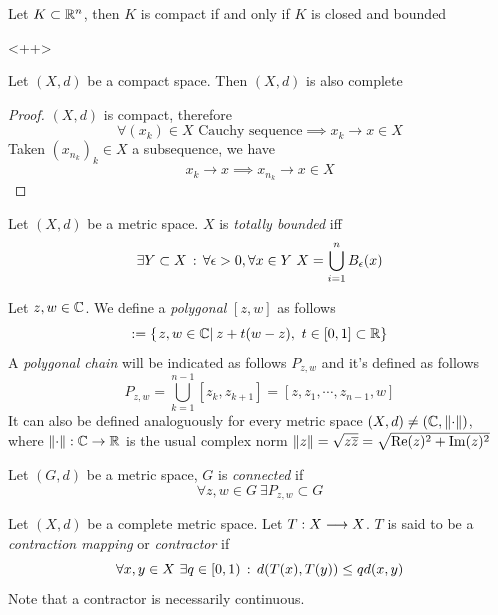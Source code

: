 \documentclass[../complete.tex]{subfiles}
\begin{document}
\begin{thm}
	Let $K\subset\mathbb{R}^n$, then $K$ is compact if and only if $K$ is closed and bounded
\end{thm}<++>
\begin{thm}
	Let $(X,d)$ be a compact space. Then $(X,d)$ is also complete
\end{thm}
\begin{proof}
	$(X,d)$ is compact, therefore
	\begin{equation*}
		\forall(x_k)\in X\text{ Cauchy sequence}\implies{} x_k\to x\in X
	\end{equation*}
	Taken $(x_{n_k})_k\in X$ a subsequence, we have
	\begin{equation*}
		x_{k}\to x\implies{} x_{n_k}\to x\in X
	\end{equation*}
\end{proof}
\begin{dfn}
	Let $(X,d)$ be a metric space. $X$ is \textit{totally bounded} iff
	\begin{equation*}
		\exists Y\subset X\st\forall\epsilon>0,\forall x\in Y\ X=\bigcup_{i=1}^nB_\epsilon(x)
	\end{equation*}
\end{dfn}
\begin{dfn}
	Let $z,w\in\mathbb{C}$. We define a \textit{polygonal} $[z,w]$ as follows
	\begin{equation*}
		[z,w]:=\{\derin{z,w\in\Cf}z+t(w-z),\ t\in[0,1]\subset\R\}
	\end{equation*}
	A \textit{polygonal chain} will be indicated as follows $P_{z,w}$ and it's defined as follows
	\begin{equation*}
		P_{z,w}=\bigcup_{k=1}^{n-1}[z_k,z_{k+1}]=[z,z_1,\cdots,z_{n-1},w]
	\end{equation*}
	It can also be defined analoguously for every metric space $(X,d)\ne(\mathbb{C},\norm{\cdot})$, where $\norm{\cdot}:\mathbb{C}\to\mathbb{R}$ is the usual complex norm $\norm{z}=\sqrt{z\overline{z}}=\sqrt{\Re(z)^2+\Im(z)^2}$
\end{dfn}
\begin{dfn}
	Let $(G,d)$ be a metric space, $G$ is \textit{connected} if
	\begin{equation*}
		\forall z,w\in G\ \exists P_{z,w}\subset G
	\end{equation*}
\end{dfn}
\begin{dfn}
	Let $(X,d)$ be a complete metric space. Let $T:X\overset{}{\longrightarrow} X$. $T$ is said to be a \textit{contraction mapping} or \textit{contractor} if
	\begin{equation}
		\forall x,y\in X\ \exists q\in[0,1)\, :\,  d(T(x),T(y))\le qd(x,y)
		\label{eq:contractor}
	\end{equation}
	Note that a contractor is necessarily continuous.
\end{dfn}
\end{document}
